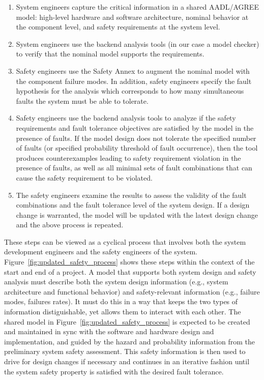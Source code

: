 \begin{enumerate}
	\item System engineers capture the critical information in a shared AADL/AGREE model:  high-level hardware and software architecture, nominal behavior at the component level, and safety requirements at the system level.%
	\item System engineers use the backend analysis tools (in our case a model checker) to verify that the nominal model supports the requirements.
	\item Safety engineers use the Safety Annex to augment the nominal model with the component failure modes. %
	In addition, safety engineers specify the fault hypothesis for the analysis which corresponds to how many simultaneous faults the system must be able to tolerate.
	\item Safety engineers use the backend analysis tools to analyze if the safety requirements and fault tolerance objectives are satisfied by the model in the presence of faults. %
	If the model design does not tolerate the specified number of faults (or specified probability threshold of fault occurrence), then the tool produces counterexamples leading to safety requirement violation in the presence of faults, %
	 as well as all minimal sets of fault combinations that can cause the safety requirement to be violated.
	\item The safety engineers examine the results to assess the validity of the fault combinations and the fault tolerance level of the system design. If a design change is warranted, the model will be updated with the latest design change and the above process is repeated.
\end{enumerate}

These steps can be viewed as a cyclical process that involves both the system development engineers and the safety engineers of the system. Figure~\ref{fig:updated_safety_process} shows these steps within the context of the start and end of a project. A model that supports both system design and safety analysis must describe both the system design information (e.g., system architecture and functional behavior) and safety-relevant information (e.g., failure modes, failures rates). It must do this in a way that keeps the two types of information distiguishable, yet allows them to interact with each other. The shared model in Figure~\ref{fig:updated_safety_process} is expected to be created and maintained in sync with the software and hardware design and implementation, and guided by the hazard and probability information from the preliminary system safety assessment. This safety information is then used to drive for design changes if necessary and continues in an iterative fashion until the system safety property is satisfied with the desired fault tolerance. 